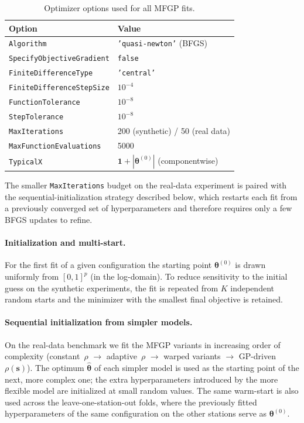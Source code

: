 \documentclass[12pt]{article}
\begin{document}
\begin{table}[h]
\centering
\small
\begin{tabular}{ll}
\toprule
Option & Value \\
\midrule
\texttt{Algorithm}                & \texttt{'quasi-newton'} (BFGS) \\
\texttt{SpecifyObjectiveGradient} & \texttt{false} \\
\texttt{FiniteDifferenceType}     & \texttt{'central'} \\
\texttt{FiniteDifferenceStepSize} & $10^{-4}$ \\
\texttt{FunctionTolerance}        & $10^{-8}$ \\
\texttt{StepTolerance}            & $10^{-8}$ \\
\texttt{MaxIterations}            & 200 (synthetic) / 50 (real data) \\
\texttt{MaxFunctionEvaluations}   & 5000 \\
\texttt{TypicalX}                 & $\mathbf{1}+|\bm{\theta}^{(0)}|$ (componentwise) \\
\bottomrule
\end{tabular}
\caption{Optimizer options used for all MFGP fits.}
\label{tab:optim_opts}
\end{table}

The smaller \texttt{MaxIterations} budget on the real-data experiment is paired with the sequential-initialization strategy described below, which restarts each fit from a previously converged set of hyperparameters and therefore requires only a few BFGS updates to refine.

\paragraph{Initialization and multi-start.} For the first fit of a given configuration the starting point $\bm{\theta}^{(0)}$ is drawn uniformly from $[0,1]^{p}$ (in the log-domain). To reduce sensitivity to the initial guess on the synthetic experiments, the fit is repeated from $K$ independent random starts and the minimizer with the smallest final objective is retained.

\paragraph{Sequential initialization from simpler models.} On the real-data benchmark we fit the MFGP variants in increasing order of complexity (constant~$\rho$ $\rightarrow$ adaptive~$\rho$ $\rightarrow$ warped variants $\rightarrow$ GP-driven~$\rho(\bm{s})$). The optimum $\hat{\bm{\theta}}$ of each simpler model is used as the starting point of the next, more complex one; the extra hyperparameters introduced by the more flexible model are initialized at small random values. The same warm-start is also used across the leave-one-station-out folds, where the previously fitted hyperparameters of the same configuration on the other stations serve as $\bm{\theta}^{(0)}$.
\end{document}
